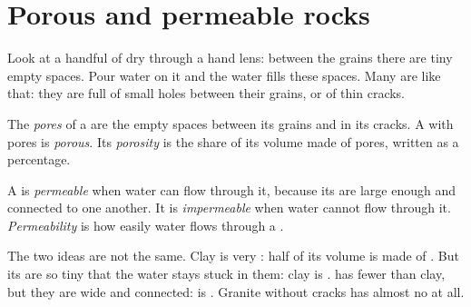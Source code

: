\section{Porous and permeable rocks}

Look at a handful of dry  through a hand lens: between the grains there
are tiny empty spaces. Pour water on it and the water fills these spaces.
Many  are like that: they are full of small holes between their grains,
or of thin cracks.

\begin{definition}[Porosity]\label{def:g6:water-underground:porosity}
The \emph{pores} of a  are the empty spaces between its grains
and in its cracks. A  with pores is \emph{porous}. Its
\emph{porosity} is the share of its volume made of pores,
written as a percentage.
\end{definition}

\begin{definition}[Permeability]\label{def:g6:water-underground:permeability}
A  is \emph{permeable} when water can flow through it,
because its  are large enough and connected to one another. It is
\emph{impermeable} when water cannot flow through it.
\emph{Permeability} is how easily water flows through
a .
\end{definition}

The two ideas are not the same. Clay is very : half of its volume is
made of . But its  are so tiny that the water stays stuck in
them: clay is \emph{}.  has fewer  than clay, but they
are wide and connected:  is \emph{}. Granite without cracks
has almost no  at all.

